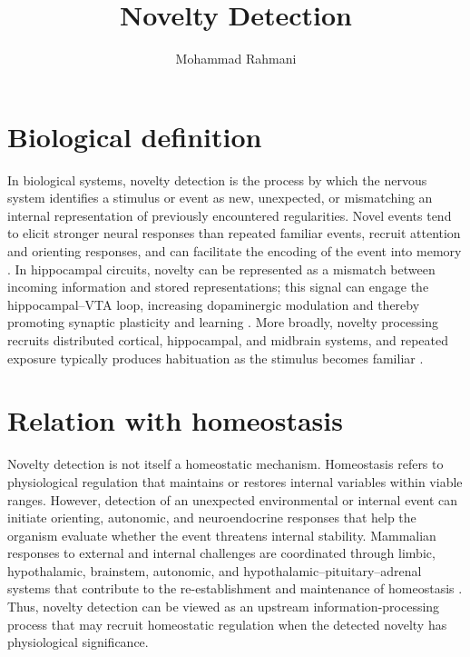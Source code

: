 \documentclass[a4paper]{article}
\title{Novelty Detection}
\date{}
\author{Mohammad Rahmani}
\begin{document}
   \maketitle
   
   \section{Biological definition}
   In biological systems, novelty detection is the process by which the nervous system identifies a stimulus or event as new, unexpected, or mismatching an internal representation of previously encountered regularities. Novel events tend to elicit stronger neural responses than repeated familiar events, recruit attention and orienting responses, and can facilitate the encoding of the event into memory \cite{ranganath-rainer-2003-neural-mechanisms-for-detecting-and-remembering-novel-events,sokolov-1990-the-orienting-response-and-future-directions-of-its-development}. In hippocampal circuits, novelty can be represented as a mismatch between incoming information and stored representations; this signal can engage the hippocampal--VTA loop, increasing dopaminergic modulation and thereby promoting synaptic plasticity and learning \cite{lisman-grace-2005-the-hippocampal-vta-loop-controlling-the-entry-of-information-into-long-term-memory}. More broadly, novelty processing recruits distributed cortical, hippocampal, and midbrain systems, and repeated exposure typically produces habituation as the stimulus becomes familiar \cite{tapper-molas-2020-midbrain-circuits-of-novelty-processing}.

   \section{Relation with homeostasis}
   Novelty detection is not itself a homeostatic mechanism. Homeostasis refers to physiological regulation that maintains or restores internal variables within viable ranges. However, detection of an unexpected environmental or internal event can initiate orienting, autonomic, and neuroendocrine responses that help the organism evaluate whether the event threatens internal stability. Mammalian responses to external and internal challenges are coordinated through limbic, hypothalamic, brainstem, autonomic, and hypothalamic--pituitary--adrenal systems that contribute to the re-establishment and maintenance of homeostasis \cite{ulrich-lai-herman-2009-neural-regulation-of-endocrine-and-autonomic-stress-responses}. Thus, novelty detection can be viewed as an upstream information-processing process that may recruit homeostatic regulation when the detected novelty has physiological significance.
\end{document}
